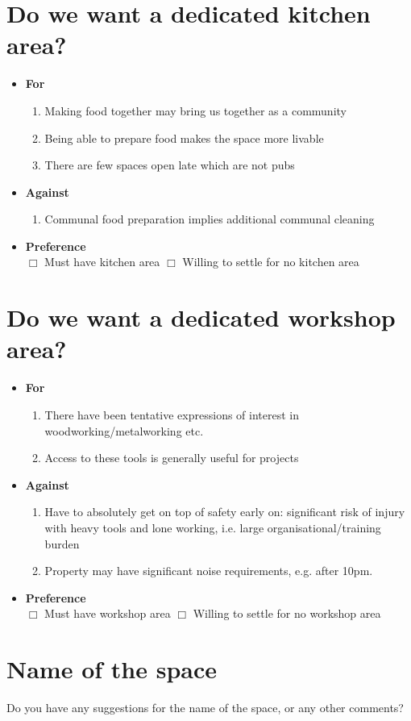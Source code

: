 \documentclass[17pt]{extreport}
\begin{document}
\section*{Do we want a dedicated kitchen area?}
\begin{itemize}

\item\textbf{For}
  \begin{enumerate}
    \item Making food together may bring us together as a community
    \item Being able to prepare food makes the space more livable
    \item There are few spaces open late which are not pubs
  \end{enumerate}
\item\textbf{Against}
  \begin{enumerate}
    \item Communal food preparation implies additional communal cleaning
  \end{enumerate}
\item\textbf{Preference}\\$\Box$ Must have kitchen area $\Box$ Willing to settle for no kitchen area
\end{itemize}

\thispagestyle{empty}
\section*{Do we want a dedicated workshop area?}
\begin{itemize}

\item\textbf{For}
  \begin{enumerate}
    \item There have been tentative expressions of interest in woodworking/metalworking etc.
    \item Access to these tools is generally useful for projects
  \end{enumerate}
\item\textbf{Against}
  \begin{enumerate}
  \item Have to absolutely get on top of safety early on: significant risk of injury with heavy tools and lone working, i.e. large organisational/training burden
  \item Property may have significant noise requirements, e.g. after 10pm.
  \end{enumerate}
\item\textbf{Preference}\\$\Box$ Must have workshop area $\Box$ Willing to settle for no workshop area
\end{itemize}

\section*{Name of the space}
Do you have any suggestions for the name of the space, or any other comments?
\end{document}
